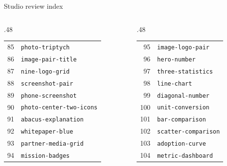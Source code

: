 \documentclass[aspectratio=169]{beamer}
\begin{document}
\begin{frame}{Studio review index}\fontsize{6.5}{9}\selectfont\begin{columns}[T]
\begin{column}{.48\textwidth}\begin{tabular}{rl}
85 & \texttt{photo-triptych} \\
86 & \texttt{image-pair-title} \\
87 & \texttt{nine-logo-grid} \\
88 & \texttt{screenshot-pair} \\
89 & \texttt{phone-screenshot} \\
90 & \texttt{photo-center-two-icons} \\
91 & \texttt{abacus-explanation} \\
92 & \texttt{whitepaper-blue} \\
93 & \texttt{partner-media-grid} \\
94 & \texttt{mission-badges} \\
\end{tabular}\end{column}
\begin{column}{.48\textwidth}\begin{tabular}{rl}
95 & \texttt{image-logo-pair} \\
96 & \texttt{hero-number} \\
97 & \texttt{three-statistics} \\
98 & \texttt{line-chart} \\
99 & \texttt{diagonal-number} \\
100 & \texttt{unit-conversion} \\
101 & \texttt{bar-comparison} \\
102 & \texttt{scatter-comparison} \\
103 & \texttt{adoption-curve} \\
104 & \texttt{metric-dashboard} \\
\end{tabular}\end{column}
\end{columns}\end{frame}
\end{document}
